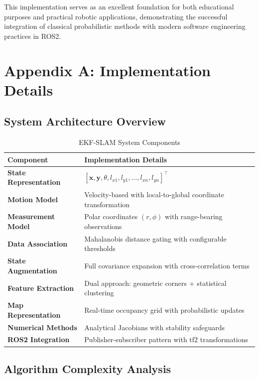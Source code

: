 \documentclass[12pt,a4paper]{article}
\begin{document}
This implementation serves as an excellent foundation for both educational purposes and practical robotic applications, demonstrating the successful integration of classical probabilistic methods with modern software engineering practices in ROS2.

\section*{Appendix A: Implementation Details}

\subsection*{System Architecture Overview}

\begin{table}[H]
\centering
\caption{EKF-SLAM System Components}
\begin{tabular}{@{}ll@{}}
\toprule
\textbf{Component} & \textbf{Implementation Details} \\
\midrule
\textbf{State Representation} & $[\mathbf{x}, \mathbf{y}, \theta, l_{x1}, l_{y1}, \dots, l_{xn}, l_{yn}]^\top$ \\
\textbf{Motion Model} & Velocity-based with local-to-global coordinate transformation \\
\textbf{Measurement Model} & Polar coordinates $(r, \phi)$ with range-bearing observations \\
\textbf{Data Association} & Mahalanobis distance gating with configurable thresholds \\
\textbf{State Augmentation} & Full covariance expansion with cross-correlation terms \\
\textbf{Feature Extraction} & Dual approach: geometric corners + statistical clustering \\
\textbf{Map Representation} & Real-time occupancy grid with probabilistic updates \\
\textbf{Numerical Methods} & Analytical Jacobians with stability safeguards \\
\textbf{ROS2 Integration} & Publisher-subscriber pattern with tf2 transformations \\
\bottomrule
\end{tabular}
\end{table}

\subsection*{Algorithm Complexity Analysis}
\end{document}
